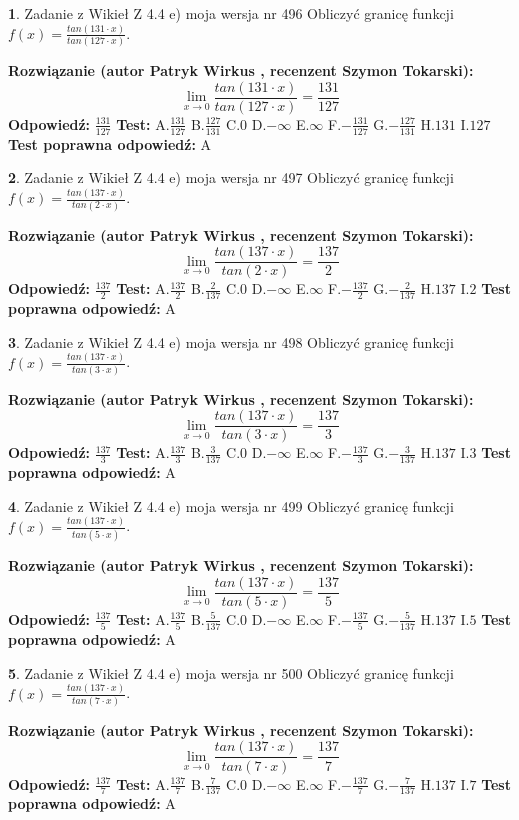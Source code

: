 \documentclass[12pt, a4paper]{article}
\theoremstyle{definition} %
\newtheorem{zad}{}
\newcommand{\zadStart}[1]{\begin{zad}#1\newline}
\newcommand{\zadStop}{\end{zad}}
\newcommand{\rozwStart}[2]{\noindent \textbf{Rozwiązanie (autor #1 , recenzent #2): }\newline}
\newcommand{\rozwStop}{\newline}
\newcommand{\odpStart}{\noindent \textbf{Odpowiedź:}\newline}
\newcommand{\odpStop}{\newline}
\newcommand{\testStart}{\noindent \textbf{Test:}\newline}
\newcommand{\testStop}{\newline}
\newcommand{\kluczStart}{\noindent \textbf{Test poprawna odpowiedź:}\newline}
\newcommand{\kluczStop}{\newline}
\begin{document}
\zadStart{Zadanie z Wikieł Z 4.4 e) moja wersja nr 496}
Obliczyć granicę funkcji $f(x)=\frac{tan(131\cdot x)}{tan(127\cdot x)}$.
\zadStop
\rozwStart{Patryk Wirkus}{Szymon Tokarski}
$$\lim\limits_{x\to 0}\frac{tan(131\cdot x)}{tan(127\cdot x)}=
\frac{131}{127}$$
\rozwStop
\odpStart
$\frac{131}{127}$
\odpStop
\testStart
A.$\frac{131}{127}$
B.$\frac{127}{131}$
C.$0$
D.$-\infty$
E.$\infty$
F.$-\frac{131}{127}$
G.$-\frac{127}{131}$
H.$131$
I.$127$
\testStop
\kluczStart
A
\kluczStop



\zadStart{Zadanie z Wikieł Z 4.4 e) moja wersja nr 497}
Obliczyć granicę funkcji $f(x)=\frac{tan(137\cdot x)}{tan(2\cdot x)}$.
\zadStop
\rozwStart{Patryk Wirkus}{Szymon Tokarski}
$$\lim\limits_{x\to 0}\frac{tan(137\cdot x)}{tan(2\cdot x)}=
\frac{137}{2}$$
\rozwStop
\odpStart
$\frac{137}{2}$
\odpStop
\testStart
A.$\frac{137}{2}$
B.$\frac{2}{137}$
C.$0$
D.$-\infty$
E.$\infty$
F.$-\frac{137}{2}$
G.$-\frac{2}{137}$
H.$137$
I.$2$
\testStop
\kluczStart
A
\kluczStop



\zadStart{Zadanie z Wikieł Z 4.4 e) moja wersja nr 498}
Obliczyć granicę funkcji $f(x)=\frac{tan(137\cdot x)}{tan(3\cdot x)}$.
\zadStop
\rozwStart{Patryk Wirkus}{Szymon Tokarski}
$$\lim\limits_{x\to 0}\frac{tan(137\cdot x)}{tan(3\cdot x)}=
\frac{137}{3}$$
\rozwStop
\odpStart
$\frac{137}{3}$
\odpStop
\testStart
A.$\frac{137}{3}$
B.$\frac{3}{137}$
C.$0$
D.$-\infty$
E.$\infty$
F.$-\frac{137}{3}$
G.$-\frac{3}{137}$
H.$137$
I.$3$
\testStop
\kluczStart
A
\kluczStop



\zadStart{Zadanie z Wikieł Z 4.4 e) moja wersja nr 499}
Obliczyć granicę funkcji $f(x)=\frac{tan(137\cdot x)}{tan(5\cdot x)}$.
\zadStop
\rozwStart{Patryk Wirkus}{Szymon Tokarski}
$$\lim\limits_{x\to 0}\frac{tan(137\cdot x)}{tan(5\cdot x)}=
\frac{137}{5}$$
\rozwStop
\odpStart
$\frac{137}{5}$
\odpStop
\testStart
A.$\frac{137}{5}$
B.$\frac{5}{137}$
C.$0$
D.$-\infty$
E.$\infty$
F.$-\frac{137}{5}$
G.$-\frac{5}{137}$
H.$137$
I.$5$
\testStop
\kluczStart
A
\kluczStop



\zadStart{Zadanie z Wikieł Z 4.4 e) moja wersja nr 500}
Obliczyć granicę funkcji $f(x)=\frac{tan(137\cdot x)}{tan(7\cdot x)}$.
\zadStop
\rozwStart{Patryk Wirkus}{Szymon Tokarski}
$$\lim\limits_{x\to 0}\frac{tan(137\cdot x)}{tan(7\cdot x)}=
\frac{137}{7}$$
\rozwStop
\odpStart
$\frac{137}{7}$
\odpStop
\testStart
A.$\frac{137}{7}$
B.$\frac{7}{137}$
C.$0$
D.$-\infty$
E.$\infty$
F.$-\frac{137}{7}$
G.$-\frac{7}{137}$
H.$137$
I.$7$
\testStop
\kluczStart
A
\kluczStop
\end{document}
